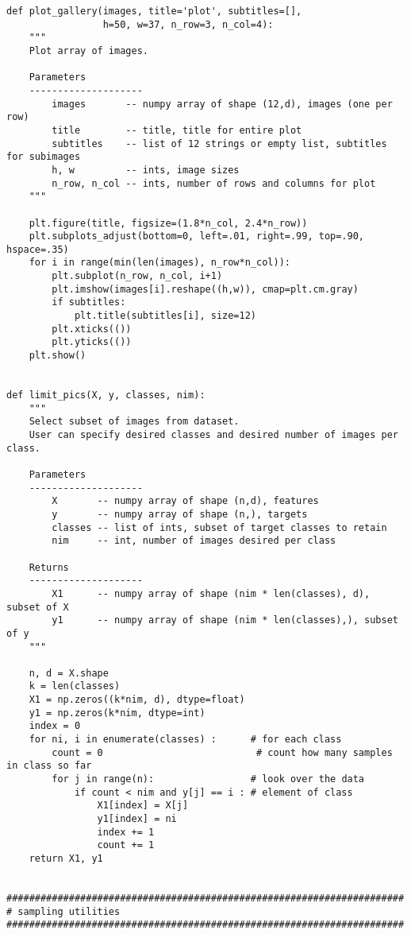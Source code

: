 \documentclass[11pt]{article}
\begin{document}
\begin{verbatim}
def plot_gallery(images, title='plot', subtitles=[],
                 h=50, w=37, n_row=3, n_col=4):
    """
    Plot array of images.
    
    Parameters
    --------------------
        images       -- numpy array of shape (12,d), images (one per row)
        title        -- title, title for entire plot
        subtitles    -- list of 12 strings or empty list, subtitles for subimages
        h, w         -- ints, image sizes
        n_row, n_col -- ints, number of rows and columns for plot
    """
    
    plt.figure(title, figsize=(1.8*n_col, 2.4*n_row))
    plt.subplots_adjust(bottom=0, left=.01, right=.99, top=.90, hspace=.35)
    for i in range(min(len(images), n_row*n_col)):
        plt.subplot(n_row, n_col, i+1)
        plt.imshow(images[i].reshape((h,w)), cmap=plt.cm.gray)
        if subtitles:
            plt.title(subtitles[i], size=12)
        plt.xticks(())
        plt.yticks(())
    plt.show()


def limit_pics(X, y, classes, nim):
    """
    Select subset of images from dataset.
    User can specify desired classes and desired number of images per class.
    
    Parameters
    --------------------
        X       -- numpy array of shape (n,d), features
        y       -- numpy array of shape (n,), targets
        classes -- list of ints, subset of target classes to retain
        nim     -- int, number of images desired per class
    
    Returns
    --------------------
        X1      -- numpy array of shape (nim * len(classes), d), subset of X
        y1      -- numpy array of shape (nim * len(classes),), subset of y
    """
    
    n, d = X.shape
    k = len(classes)
    X1 = np.zeros((k*nim, d), dtype=float)
    y1 = np.zeros(k*nim, dtype=int)
    index = 0
    for ni, i in enumerate(classes) :      # for each class
        count = 0                           # count how many samples in class so far
        for j in range(n):                 # look over the data
            if count < nim and y[j] == i : # element of class
                X1[index] = X[j]
                y1[index] = ni
                index += 1
                count += 1
    return X1, y1


######################################################################
# sampling utilities
######################################################################


\end{verbatim}
\end{document}
